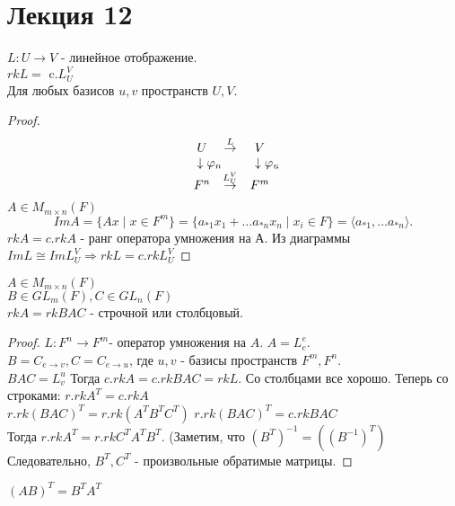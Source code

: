 \documentclass[12pt]{report}
\begin{document}
\section{Лекция 12}
\begin{lm}
    $L: U \to V$ - линейное отображение.\\
    $rk L = \mbox{ c.} L_U ^V$ \\
    Для любых базисов $u, v$ пространств $U, V$.
\end{lm}
\begin{proof}
    \[
	\begin{array}{ccc}
	    U & \stackrel{L}\to & V \\
	    \downarrow \lefteqn {\varphi_n} && \downarrow \lefteqn{\varphi_v} \\
	    F^n & \stackrel{L_U ^V} \to & F^m
    \end{array}
    .\] 
    $A \in M_{m \times n} (F)$
    \[
	Im A = \{A x \mid x \in  F^m\} = \{a_{*1} x_1 + \ldots a_{*n}x_n \mid x_i \in  F\} = \langle a_{*1} , \ldots a_{*n} \rangle
    .\] 
    $rk A = c. rk A$ - ранг оператора умножения на А.
    Из диаграммы $Im L \cong Im L_U ^V \Rightarrow rk L = c.rk L_U ^V $
\end{proof}
\begin{lm}
    $A \in M_{m \times n} (F)$\\
    $B \in GL_m(F), C \in GL_n (F)$ \\
    $rk A = rk B A C$ - строчной или столбцовый.
\end{lm}
\begin{proof}
    $L : F^n \to F^m $- оператор умножения на $A$. $A = L_e ^e$.\\
    $B = C_{e \to v}, C = C_{e \to u}$, где $u, v$ - базисы пространств $F^m , F^n$.\\
    $BAC = L_v ^ u$
    Тогда  $c. rk A = c.rk BAC = rk L$.
    Со столбцами все хорошо.
    Теперь со строками:
    $r. rk A^T = c. rk A$ \\
    $r. rk (BAC)^T = r. rk (A^T B^T C^T)$
    $r. rk (BAC)^T = c. rk BAC$ \\
    Тогда $r. rk A^T = r. rk C^T A^T B^T$. (Заметим, что   $(B^T)^{-1} = ((B^{-1})^T)$
    Следовательно, $B^T, C^T$ - произвольные обратимые матрицы.
\end{proof}
\begin{prac}
    $(AB)^T = B^T A^T$
\end{prac}
\end{document}
